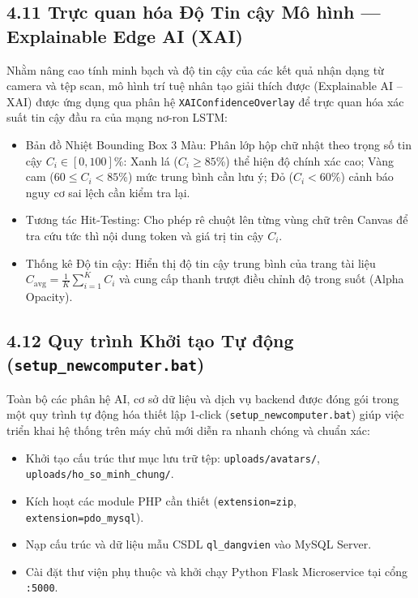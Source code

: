 \documentclass[12pt,a4paper]{report}
\begin{document}
\subsection*{4.11 Trực quan hóa Độ Tin cậy Mô hình — Explainable Edge AI (XAI)}
Nhằm nâng cao tính minh bạch và độ tin cậy của các kết quả nhận dạng từ camera và tệp scan, mô hình trí tuệ nhân tạo giải thích được (Explainable AI -- XAI) được ứng dụng qua phân hệ \texttt{XAIConfidenceOverlay} để trực quan hóa xác suất tin cậy đầu ra của mạng nơ-ron LSTM:
\begin{itemize}[label=--,leftmargin=*]
  \item Bản đồ Nhiệt Bounding Box 3 Màu: Phân lớp hộp chữ nhật theo trọng số tin cậy $C_i \in [0, 100]\%$: Xanh lá ($C_i \ge 85$\%) thể hiện độ chính xác cao; Vàng cam ($60 \le C_i < 85$\%) mức trung bình cần lưu ý; Đỏ ($C_i < 60$\%) cảnh báo nguy cơ sai lệch cần kiểm tra lại.
  \item Tương tác Hit-Testing: Cho phép rê chuột lên từng vùng chữ trên Canvas để tra cứu tức thì nội dung token và giá trị tin cậy $C_i$.
  \item Thống kê Độ tin cậy: Hiển thị độ tin cậy trung bình của trang tài liệu $C_{\text{avg}} = \frac{1}{K}\sum_{i=1}^K C_i$ và cung cấp thanh trượt điều chỉnh độ trong suốt (Alpha Opacity).
\end{itemize}

\subsection*{4.12 Quy trình Khởi tạo Tự động (\texttt{setup\_newcomputer.bat})}
Toàn bộ các phân hệ AI, cơ sở dữ liệu và dịch vụ backend được đóng gói trong một quy trình tự động hóa thiết lập 1-click (\texttt{setup\_newcomputer.bat}) giúp việc triển khai hệ thống trên máy chủ mới diễn ra nhanh chóng và chuẩn xác:
\begin{itemize}[label=--,leftmargin=*]
  \item Khởi tạo cấu trúc thư mục lưu trữ tệp: \texttt{uploads/avatars/}, \texttt{uploads/ho\_so\_minh\_chung/}.
  \item Kích hoạt các module PHP cần thiết (\texttt{extension=zip}, \texttt{extension=pdo\_mysql}).
  \item Nạp cấu trúc và dữ liệu mẫu CSDL \texttt{ql\_dangvien} vào MySQL Server.
  \item Cài đặt thư viện phụ thuộc và khởi chạy Python Flask Microservice tại cổng \texttt{:5000}.
\end{itemize}
\end{document}
